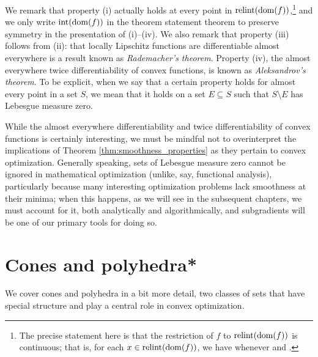 We remark that property (i) actually holds at every point in
$\operatorname{relint}(\operatorname{dom}(f))$,\footnote{The precise statement here is that the restriction
  of $f$ to $\operatorname{relint}(\operatorname{dom}(f))$ is continuous; that is, for each $x \in
  \operatorname{relint}(\operatorname{dom}(f))$, we have 
  whenever  and .} 
and we only write $\operatorname{int}(\operatorname{dom}(f))$ in the theorem statement theorem to
preserve symmetry in the presentation of (i)--(iv). We also remark that property 
(iii) follows from (ii): that locally Lipschitz functions are differentiable
almost everywhere is a result known as \emph{Rademacher's theorem}. Property
(iv), the almost everywhere twice differentiability of convex functions, is
known as \emph{Aleksandrov's theorem}. To be explicit, when we say that a
certain property holds for almost every point in a set $S$, we mean that it
holds on a set $E \subseteq S$ such that $S \setminus E$ has Lebesgue measure
zero.


While the almost everywhere differentiability and twice differentiability of
convex functions is certainly interesting, we must be mindful not to
overinterpret the implications of Theorem \ref{thm:smoothness_properties} as
they pertain to convex optimization. Generally speaking, sets of Lebesgue
measure zero cannot be ignored in mathematical optimization (unlike, say,
functional analysis), particularly because many interesting optimization
problems lack smoothness at their minima; when this happens, as we will see in
the subsequent chapters, we must account for it, both analytically and 
algorithmically, and subgradients will be one of our primary tools for doing
so. 

\section{Cones and polyhedra*}
\label{sec:cones_polyhedra}

We cover cones and polyhedra in a bit more detail, two classes of sets that 
have special structure and play a central role in convex optimization. 

